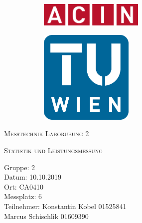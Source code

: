 \documentclass[a4paper,12pt]{article}
\begin{document}
	\begin{titlepage}
		\begin{figure}[h]
			\begin{subfigure}{1cm}
				\includegraphics[width=5cm]{img/acinlogo}
			\end{subfigure}
			\hspace{10cm}
			\begin{subfigure}{6cm}
				\includegraphics[width=4.5cm]{img/TUlogo}
			\end{subfigure}
		\end{figure}
		\centering
		\bigskip \bigskip \bigskip \bigskip \bigskip
		\scshape\Huge Messtechnik Laborübung 2\par
		\vspace{1cm}
		\scshape\Large  Statistik und Leistungsmessung \par
		\vspace{2cm}
		\raggedright
		\large Gruppe: 2 \\
		Datum: 10.10.2019 \\
		Ort: CA0410 \\
		Messplatz: 6 \\
		Teilnehmer: Konstantin Kobel 01525841\\
		\hspace{3.25cm}Marcus Schischlik 01609390 \\
		\vfill
		\large \par
	\end{titlepage}
\end{document}

